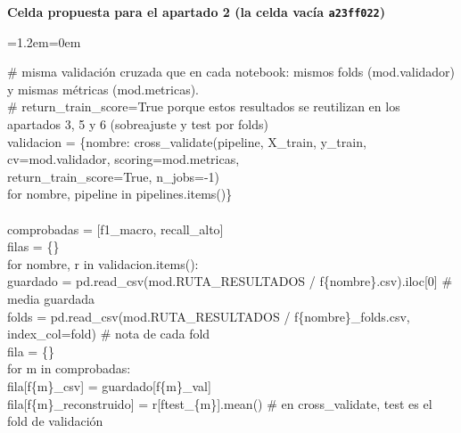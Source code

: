 \documentclass[11pt,a4paper]{article}
\newenvironment{codigo}
  {\par\smallskip\begin{list}{}{\leftmargin=1.2em\rightmargin=0em}\item\relax\ttfamily\scriptsize\raggedright}
  {\end{list}\smallskip}
\begin{document}
{\smallskip\noindent\textbf{Celda propuesta para el apartado 2 (la celda vacía \texttt{a23ff022})}\par
\begin{codigo}
\# misma validación cruzada que en cada notebook: mismos folds (mod.validador) y mismas métricas (mod.metricas). \\{}
\# return\_\allowbreak{}train\_\allowbreak{}score=True porque estos resultados se reutilizan en los apartados 3, 5 y 6 (sobreajuste y test por folds) \\{}
validacion = \{nombre: cross\_\allowbreak{}validate(pipeline, X\_\allowbreak{}train, y\_\allowbreak{}train, cv=mod.validador, scoring=mod.metricas, \\{}
\hspace*{19.24em}return\_\allowbreak{}train\_\allowbreak{}score=True, n\_\allowbreak{}jobs=-1) \\{}
\hspace*{7.28em}for nombre, pipeline in pipelines.items()\} \\{}
\mbox{} \\{}
comprobadas = [\textquotedbl{}f1\_\allowbreak{}macro\textquotedbl{}, \textquotedbl{}recall\_\allowbreak{}alto\textquotedbl{}] \\{}
filas = \{\} \\{}
for nombre, r in validacion.items(): \\{}
\hspace*{2.08em}guardado = pd.read\_\allowbreak{}csv(mod.RUTA\_\allowbreak{}RESULTADOS /\allowbreak{} f\textquotedbl{}\{nombre\}.csv\textquotedbl{}).iloc[0]                    \# media guardada \\{}
\hspace*{2.08em}folds = pd.read\_\allowbreak{}csv(mod.RUTA\_\allowbreak{}RESULTADOS /\allowbreak{} f\textquotedbl{}\{nombre\}\_\allowbreak{}folds.csv\textquotedbl{}, index\_\allowbreak{}col=\textquotedbl{}fold\textquotedbl{})        \# nota de cada fold \\{}
\hspace*{2.08em}fila = \{\} \\{}
\hspace*{2.08em}for m in comprobadas: \\{}
\hspace*{4.16em}fila[f\textquotedbl{}\{m\}\_\allowbreak{}csv\textquotedbl{}] = guardado[f\textquotedbl{}\{m\}\_\allowbreak{}val\textquotedbl{}] \\{}
\hspace*{4.16em}fila[f\textquotedbl{}\{m\}\_\allowbreak{}reconstruido\textquotedbl{}] = r[f\textquotedbl{}test\_\allowbreak{}\{m\}\textquotedbl{}].mean()       \# en cross\_\allowbreak{}validate, \textquotedbl{}test\textquotedbl{} es el fold de validación \\{}

\end{codigo}}
\end{document}
